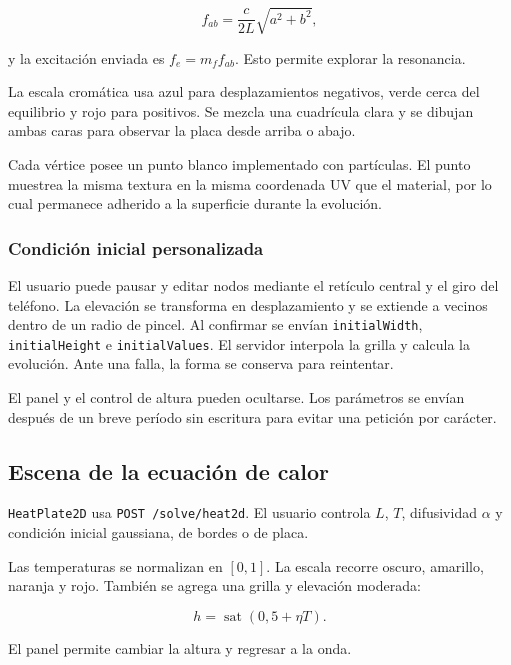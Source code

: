 \begin{equation}
f_{ab}=\frac{c}{2L}\sqrt{a^2+b^2},
\end{equation}

y la excitación enviada es $f_e=m_f f_{ab}$. Esto permite explorar la resonancia.

La escala cromática usa azul para desplazamientos negativos, verde cerca del equilibrio
y rojo para positivos. Se mezcla una cuadrícula clara y se dibujan ambas caras para
observar la placa desde arriba o abajo.

Cada vértice posee un punto blanco implementado con partículas. El punto muestrea la
misma textura en la misma coordenada UV que el material, por lo cual permanece adherido
a la superficie durante la evolución.

\subsubsection{Condición inicial personalizada}

El usuario puede pausar y editar nodos mediante el retículo central y el giro del
teléfono. La elevación se transforma en desplazamiento y se extiende a vecinos dentro
de un radio de pincel. Al confirmar se envían \texttt{initialWidth},
\texttt{initialHeight} e \texttt{initialValues}. El servidor interpola la grilla y
calcula la evolución. Ante una falla, la forma se conserva para reintentar.

El panel y el control de altura pueden ocultarse. Los parámetros se envían después de
un breve período sin escritura para evitar una petición por carácter.

\subsection{Escena de la ecuación de calor}

\texttt{HeatPlate2D} usa \texttt{POST /solve/heat2d}. El usuario controla $L$, $T$,
difusividad $\alpha$ y condición inicial gaussiana, de bordes o de placa.

Las temperaturas se normalizan en $[0,1]$. La escala recorre oscuro, amarillo, naranja
y rojo. También se agrega una grilla y elevación moderada:

\begin{equation}
h=\operatorname{sat}\left(0{,}5+\eta T\right).
\end{equation}

El panel permite cambiar la altura y regresar a la onda.


